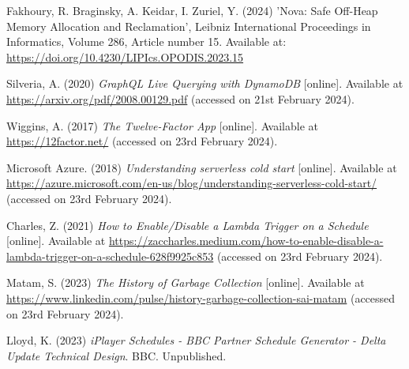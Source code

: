 \noindent Fakhoury, R. Braginsky, A. Keidar, I. Zuriel, Y. (2024) 'Nova: Safe Off-Heap Memory Allocation and Reclamation', Leibniz International Proceedings in Informatics, Volume 286, Article number 15. Available at: \url{https://doi.org/10.4230/LIPIcs.OPODIS.2023.15}
\vspace{0.2cm}

\noindent Silveria, A. (2020) \textit{GraphQL Live Querying with DynamoDB} [online]. Available at \url{https://arxiv.org/pdf/2008.00129.pdf} (accessed on 21st February 2024).
\vspace{0.2cm}

\noindent Wiggins, A. (2017) \textit{The Twelve-Factor App} [online]. Available at \url{https://12factor.net/} (accessed on 23rd February 2024).
\vspace{0.2cm}

\noindent Microsoft Azure. (2018) \textit{Understanding serverless cold start} [online]. Available at \url{https://azure.microsoft.com/en-us/blog/understanding-serverless-cold-start/} (accessed on 23rd February 2024).
\vspace{0.2cm}

\noindent Charles, Z. (2021) \textit{How to Enable/Disable a Lambda Trigger on a Schedule} [online]. Available at \url{https://zaccharles.medium.com/how-to-enable-disable-a-lambda-trigger-on-a-schedule-628f9925c853} (accessed on 23rd February 2024).
\vspace{0.2cm}

\noindent Matam, S. (2023) \textit{The History of Garbage Collection} [online]. Available at \url{https://www.linkedin.com/pulse/history-garbage-collection-sai-matam} (accessed on 23rd February 2024).
\vspace{0.2cm}

\noindent Lloyd, K. (2023) \textit{iPlayer Schedules - BBC Partner Schedule Generator - Delta Update Technical Design}. BBC. Unpublished.
\vspace{0.2cm}

\newpage

